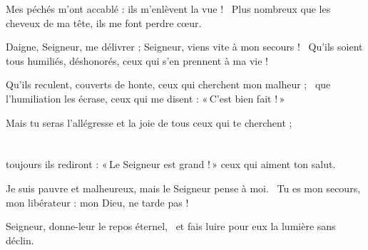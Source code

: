 \item Mes péchés m'ont accablé : ils m'enlèvent la vue !~\psstar{} Plus nombreux que les cheveux de ma tête, ils me font perdre cœur.

\item Daigne, Seigneur, me délivrer ; Seigneur, viens vite à mon secours !~\psstar{} Qu'ils soient tous humiliés, déshonorés, ceux qui s'en prennent à ma vie !

\item Qu'ils reculent, couverts de honte, ceux qui cherchent mon malheur ;~\psstar{} que l'humiliation les écrase, ceux qui me disent : «\,C'est bien fait !\,»

\item Mais tu seras l'allégresse et la joie de tous ceux qui te cherchent ;~\psstar{} \\~\\~\\toujours ils rediront : «\,Le Seigneur est grand !\,» ceux qui aiment ton salut.

\item Je suis pauvre et malheureux, mais le Seigneur pense à moi.~\psstar{} Tu es mon secours, mon libérateur : mon Dieu, ne tarde pas !

\item Seigneur, donne-leur le repos éternel,~\psstar{} et fais luire pour eux la lumière sans déclin.